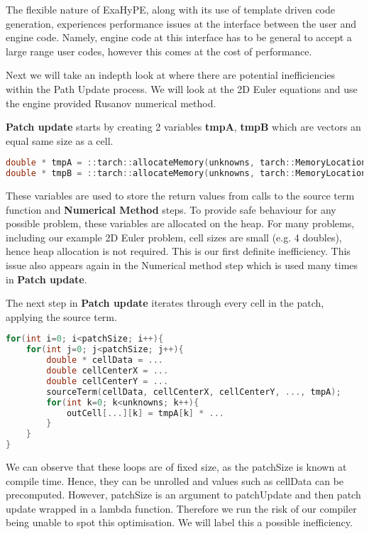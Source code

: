 \newcommand{\func}[1]{\textbf{#1}}
\newcommand{\var}[1]{\textbf{#1}}


The flexible nature of ExaHyPE, along with its use of template driven code generation, experiences performance issues at the interface between the user and engine code.
Namely, engine code at this interface has to be general to accept a large range user codes, however this comes at the cost of performance.


Next we will take an indepth look at where there are potential inefficiencies within the Path Update process.
We will look at the 2D Euler equations and use the engine provided Rusanov numerical method.


\func{Patch update} starts by creating 2 variables \var{tmpA}, \var{tmpB} which are vectors an equal same size as a cell.

\begin{lstlisting}[language=c]
double * tmpA = ::tarch::allocateMemory(unknowns, tarch::MemoryLocation::Heap);
double * tmpB = ::tarch::allocateMemory(unknowns, tarch::MemoryLocation::Heap);
\end{lstlisting}

These variables are used to store the return values from calls to the source term function and \func{Numerical Method} steps.
To provide safe behaviour for any possible problem, these variables are allocated on the heap.
For many problems, including our example 2D Euler problem, cell sizes are small (e.g. 4 doubles), hence heap allocation is not required. 
This is our first definite inefficiency.
This issue also appears again in the Numerical method step which is used many times in \func{Patch update}.

The next step in \func{Patch update} iterates through every cell in the patch, applying the source term.
\begin{lstlisting}[language=c]
for(int i=0; i<patchSize; i++){
    for(int j=0; j<patchSize; j++){
        double * cellData = ...
        double cellCenterX = ...
        double cellCenterY = ...    
        sourceTerm(cellData, cellCenterX, cellCenterY, ..., tmpA);
        for(int k=0; k<unknowns; k++){
            outCell[...][k] = tmpA[k] * ...
        }
    }
}
\end{lstlisting}


We can observe that these loops are of fixed size, as the patchSize is known at compile time. 
Hence, they can be unrolled and values such as cellData can be precomputed.   
However, patchSize is an argument to patchUpdate and then patch update wrapped in a lambda function.
Therefore we run the risk of our compiler being unable to spot this optimisation.
We will label this a possible inefficiency.

